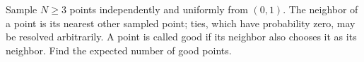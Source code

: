 Sample $N\ge3$ points independently and uniformly from $(0,1)$. The neighbor of a point is its nearest other sampled point; ties, which have probability zero, may be resolved arbitrarily. A point is called good if its neighbor also chooses it as its neighbor. Find the expected number of good points.
